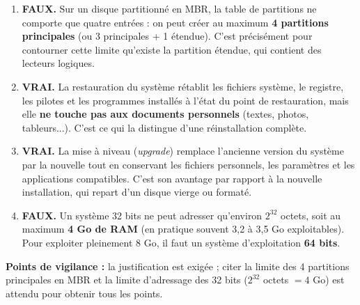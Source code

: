 \documentclass[11pt]{article}
\newcommand{\cle}[1]{{\popxbold\color{popdark}#1}}
\begin{document}
\begin{corrige}
\begin{enumerate}
\item \textbf{FAUX.} Sur un disque partitionné en \cle{MBR}, la table de partitions ne comporte que quatre entrées : on peut créer au maximum \textbf{4 partitions principales} (ou 3 principales + 1 étendue). C'est précisément pour contourner cette limite qu'existe la partition étendue, qui contient des lecteurs logiques.
\item \textbf{VRAI.} La restauration du système rétablit les fichiers système, le registre, les pilotes et les programmes installés à l'état du point de restauration, mais elle \textbf{ne touche pas aux documents personnels} (textes, photos, tableurs...). C'est ce qui la distingue d'une réinstallation complète.
\item \textbf{VRAI.} La \cle{mise à niveau} (\emph{upgrade}) remplace l'ancienne version du système par la nouvelle tout en conservant les fichiers personnels, les paramètres et les applications compatibles. C'est son avantage par rapport à la nouvelle installation, qui repart d'un disque vierge ou formaté.
\item \textbf{FAUX.} Un système 32 bits ne peut adresser qu'environ $2^{32}$ octets, soit au maximum \textbf{4 Go de RAM} (en pratique souvent 3,2 à 3,5 Go exploitables). Pour exploiter pleinement 8 Go, il faut un système d'exploitation \textbf{64 bits}.
\end{enumerate}
\textbf{Points de vigilance :} la justification est exigée ; citer la limite des 4 partitions principales en MBR et la limite d'adressage des 32 bits ($2^{32}$ octets $= 4$ Go) est attendu pour obtenir tous les points.
\end{corrige}
\end{document}
